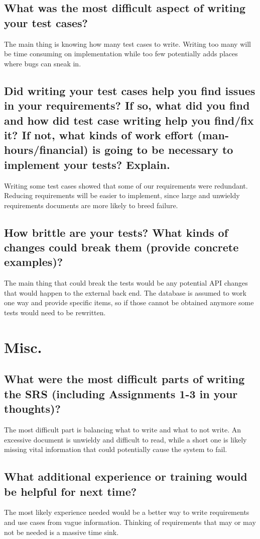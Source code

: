 \documentclass{article}
\begin{document}
    \subsection{What was the most difficult aspect of writing your test cases?}
 The main thing is knowing how many test cases to write. Writing too many will be time consuming on implementation while too few potentially adds places where bugs can sneak in.
    \subsection{Did writing your test cases help you find issues in your requirements? If so, what did you find and how did test case writing help you find/fix it? If not, what kinds of work effort (man-hours/financial) is going to be necessary to implement your tests? Explain.}
 Writing some test cases showed that some of our requirements were redundant. Reducing requirements will be easier to implement, since large and unwieldy requirements documents are more likely to breed failure.
    \subsection{How brittle are your tests? What kinds of changes could break them (provide concrete examples)?}
    The main thing that could break the tests would be any potential API changes that would happen to the external back end. The database is assumed to work one way and provide specific items, so if those cannot be obtained anymore some tests would need to be rewritten.


\section{Misc.}
    \subsection{What were the most difficult parts of writing the SRS (including Assignments 1-3 in your thoughts)?}
 The most difficult part is balancing what to write and what to not write. An excessive document is unwieldy and difficult to read, while a short one is likely missing vital information that could potentially cause the system to fail.
    \subsection{What additional experience or training would be helpful for next time?}
 The most likely experience needed would be a better way to write requirements and use cases from vague information. Thinking of requirements that may or may not be needed is a massive time sink.
\end{document}
